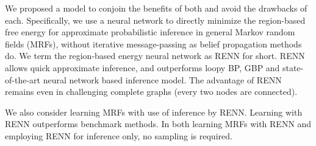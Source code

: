 We proposed a model to conjoin the benefits of both and avoid the drawbacks of each. Specifically, we use a neural network to directly minimize the region-based free energy for approximate probabilistic inference in general Markov random fields (MRFs), without iterative message-passing as belief propagation methods do. We term the region-based energy neural network as RENN for short. RENN allows quick approximate inference, and outperforms loopy BP, GBP and state-of-the-art neural network based inference model. The advantage of RENN remains even in challenging complete graphs (every two nodes are connected).

We also consider learning MRFs with use of inference by RENN. Learning with RENN outperforms benchmark methods.
In both learning MRFs with RENN and employing RENN for inference only, no sampling is required. 

